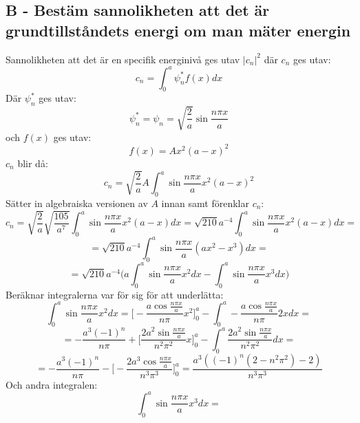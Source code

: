 \documentclass{article}
\begin{document}
      \subsection*{B - Bestäm sannolikheten att det är grundtillståndets energi om man mäter energin}
        Sannolikheten att det är en specifik energinivå ges utav $|c_n|^2$ där $c_n$ ges utav:
        \[
          c_n=\int_0^a\psi_n^*f(x)dx
        \]
        Där $\psi_n^*$ ges utav:
        \[
          \psi_n^*=\psi_n=\sqrt{\frac{2}{a}}\sin{\frac{n\pi x}{a}}
        \]
        och $f(x)$ ges utav:
        \[
          f(x)=Ax^2(a-x)^2
        \]
        $c_n$ blir då:
        \[
          c_n=\sqrt{\frac{2}{a}}A\int_0^a\sin{\frac{n\pi x}{a}}x^2(a-x)^2
        \]
        Sätter in algebraiska versionen av $A$ innan samt förenklar $c_n$:
        \[
          c_n=\sqrt{\frac{2}{a}}\sqrt{\frac{105}{a^7}}\int_0^a\sin{\frac{n\pi x}{a}}x^2(a-x)dx=\sqrt{210}a^{-4}\int_0^a\sin{\frac{n\pi x}{a}}x^2(a-x)dx=
        \]
        \[
          =\sqrt{210}a^{-4}\int_0^a\sin{\frac{n\pi x}{a}}(ax^2-x^3)dx=
        \]
        \[
          =\sqrt{210}a^{-4}\bigg(a\int_0^a\sin{\frac{n\pi x}{a}}x^2dx-\int_0^a\sin{\frac{n\pi x}{a}}x^3dx\bigg)
        \]
        Beräknar integralerna var för sig för att underlätta:
        \[
          \int_0^a\sin{\frac{n\pi x}{a}}x^2dx=\bigg[-\frac{a\cos{\frac{n\pi x}{a}}}{n\pi}x^2\bigg]_0^a-\int_0^a-\frac{a\cos{\frac{n\pi x}{a}}}{n\pi}2xdx=
        \]
        \[
          =-\frac{a^3(-1)^n}{n\pi}+\bigg[\frac{2a^2\sin{\frac{n\pi x}{a}}}{n^2\pi^2}x\bigg]_0^a-\int_0^a\frac{2a^2\sin{\frac{n\pi x}{a}}}{n^2\pi^2}dx=
        \]
        \[
          =-\frac{a^3(-1)^n}{n\pi}-\bigg[-\frac{2a^3\cos{\frac{n\pi x}{a}}}{n^3\pi^3}\bigg]_0^a=\frac{a^3((-1)^n(2-n^2\pi^2)-2)}{n^3\pi^3}
        \]
        Och andra integralen:
        \[
          \int_0^a\sin{\frac{n\pi x}{a}}x^3dx=
        \]
\end{document}

